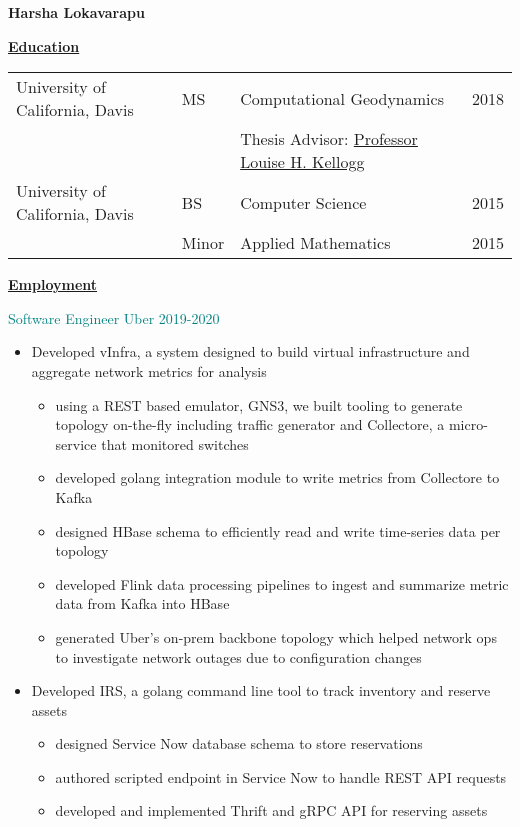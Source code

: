 \documentclass[11pt]{ltxdoc}
\begin{document}
\begin{center}
  \textbf{Harsha Lokavarapu}
\end{center}
\vskip -10pt

\textbf{\underline{Education}}

\vskip -06pt

\begin{tabular}{llll}
University of California, Davis              &MS       &Computational Geodynamics      & 2018 \\
                                             &       &Thesis Advisor: \href{http://geology.ucdavis.edu/people/faculty/kellogg.php}{Professor Louise H. Kellogg}        &  \\
University of California, Davis              &BS      & Computer Science                         & 2015       \\
                                             &Minor   & Applied Mathematics                      & 2015
\end{tabular}


\vskip -10pt
\textbf{\underline{Employment}}

		{\textcolor{teal}{Software Engineer} \hfill \textcolor{teal}{Uber} \hfill \textcolor{teal}{2019-2020}}
		\begin{itemize}
			\item Developed vInfra, a system designed to build virtual infrastructure and aggregate network metrics for analysis
			\begin{itemize}
				\item using a REST based emulator, GNS3, we built tooling to generate topology on-the-fly including traffic generator and Collectore, a micro-service that monitored switches
				\item developed golang integration module to write metrics from Collectore to Kafka
				\item designed HBase schema to efficiently read and write time-series data per topology
				\item developed Flink data processing pipelines to ingest and summarize metric data from Kafka into HBase
				\item generated Uber's on-prem backbone topology which helped network ops to investigate network outages due to configuration changes
			\end {itemize}
			
			\item Developed IRS, a golang command line tool to track inventory and reserve assets
			\begin{itemize}
				\item designed Service Now database schema to store reservations
				\item authored scripted endpoint in Service Now to handle REST API requests
				\item developed and implemented Thrift and gRPC API for reserving assets
			\end {itemize}
	 	\end{itemize}
\end{document}
